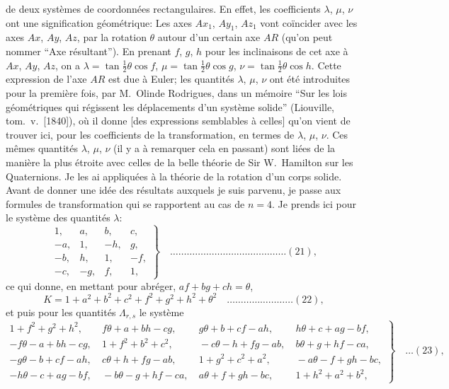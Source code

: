 \documentclass[11pt,a4paper]{book}
\begin{document}
de deux syst\`emes de coordonn\'ees rectangulaires. En effet, les coefficients $\lambda$, $\mu$, $\nu$ ont une signification g\'eom\'etrique: Les axes $Ax_1$, $Ay_1$, $Az_1$ vont co\"incider avec les axes $Ax$, $Ay$, $Az$, par la rotation $\theta$ autour d'un certain axe $AR$ (qu'on peut nommer ``Axe r\'esultant''). En prenant $f$, $g$, $h$ pour les inclinaisons de cet axe \`a $Ax$, $Ay$, $Az$, on a $\lambda = \tan \frac{1}{2}\theta \cos f$, $\mu = \tan \frac{1}{2}\theta \cos g$, $\nu = \tan \frac{1}{2}\theta \cos h$. Cette expression de l'axe $AR$ est due \`a Euler; les quantit\'es $\lambda$, $\mu$, $\nu$ ont \'et\'e introduites pour la premi\`ere fois, par M.~Olinde Rodrigues, dans un m\'emoire ``Sur les lois g\'eom\'etriques qui r\'egissent les d\'eplacements d'un syst\`eme solide'' (Liouville, tom.~v.~[1840]), o\`u il donne [des expressions semblables \`a celles] qu'on vient de trouver ici, pour les coefficients de la transformation, en termes de $\lambda$, $\mu$, $\nu$. Ces m\^emes quantit\'es $\lambda$, $\mu$, $\nu$ (il y a \`a remarquer cela en passant) sont li\'ees de la mani\`ere la plus \'etroite avec celles de la belle th\'eorie de Sir W.~Hamilton sur les Quaternions. Je les ai appliqu\'ees \`a la th\'eorie de la rotation d'un corps solide. Avant de donner une id\'ee des r\'esultats auxquels je suis parvenu, je passe aux formules de transformation qui se rapportent au cas de $n = 4$. Je prends ici pour le syst\`eme des quantit\'es $\lambda$:
\[
\left. \begin{array}{rrrr}
1, & a, & b, & c, \\
-a, & 1, & -h, & g, \\
-b, & h, & 1, & -f, \\
-c, & -g, & f, & 1,
\end{array} \right\} \quad \ldots \ldots \ldots \ldots \ldots \ldots \ldots \ldots \ldots \ldots \ldots \ldots \ldots \ldots (21),
\]
ce qui donne, en mettant pour abr\'eger, $af + bg + ch = \theta$,
\[
K = 1 + a^2 + b^2 + c^2 + f^2 + g^2 + h^2 + \theta^2 \quad \ldots \ldots \ldots \ldots \ldots \ldots \ldots \ldots (22),
\]
et puis pour les quantit\'es $\Lambda_{r,s}$ le syst\`eme
{\small
\[
\left. \begin{aligned}
1 + f^2 + g^2 + h^2, &\ f\theta + a + bh - cg, &\ g\theta + b + cf - ah, &\ h\theta + c + ag - bf, \\
-f\theta - a + bh - cg, &\ 1 + f^2 + b^2 + c^2, &\ -c\theta - h + fg - ab, &\ b\theta + g + hf - ca, \\
-g\theta - b + cf - ah, &\ c\theta + h + fg - ab, &\ 1 + g^2 + c^2 + a^2, &\ -a\theta - f + gh - bc, \\
-h\theta - c + ag - bf, &\ -b\theta - g + hf - ca, &\ a\theta + f + gh - bc, &\ 1 + h^2 + a^2 + b^2,
\end{aligned} \right\} \quad \ldots (23),
\]
}
\end{document}
